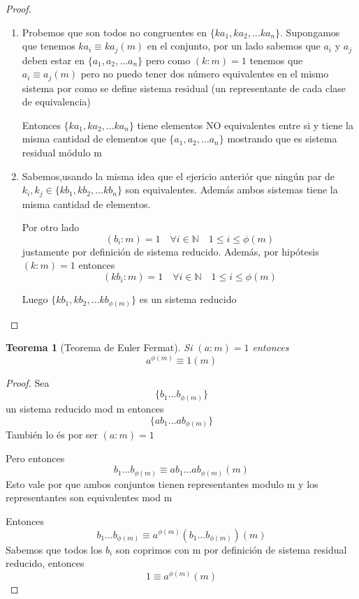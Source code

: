 \documentclass{article}
\theoremstyle{break}
\newtheorem{theorem}{Teorema}[section]
\def \N{\mathbb{N}}
\begin{document}
        \begin{proof}
            \begin{enumerate}
                \item Probemos que son todos no congruentes en $\{ka_1,ka_2,\ldots ka_n\}$.
                Supongamos que tenemos  $ka_i \equiv ka_j (m)$ en el conjunto, por un lado sabemos que 
                $a_i$ y $a_j$ deben estar en $\{a_1,a_2,\ldots a_n\}$ pero como $(k:m)=1$ 
                tenemos que $a_i \equiv a_j (m)$ pero no puedo tener dos número equivalentes en el mismo sistema
                por como se define sistema residual (un representante de cada clase de equivalencia)


                Entonces $\{ka_1,ka_2,\ldots ka_n\}$ tiene elementos NO equivalentes entre si y tiene la misma
                cantidad de elementos que $\{a_1,a_2,\ldots a_n\}$ mostrando que es sistema residual módulo m
                
                \item Sabemos,usando la misma idea que el ejericio anteriór que ningún par de 
                $k_i,k_j \in \{kb_1,kb_2,\ldots kb_n\}$ son equivalentes. Además ambos sistemas tiene la misma
                cantidad de elementos. 
                
                Por otro lado $$(b_i:m)=1 \quad\forall i\in\N \quad 1\leq i \leq \phi(m)$$ justamente por 
                definición de sistema reducido. Además, por hipótesis $(k:m)=1$ 
                entonces $$(kb_i:m)=1 \quad\forall i\in\N \quad  1\leq i \leq \phi(m)$$

                Luego $\{kb_1,kb_2,\ldots kb_{\phi(m)}\}$ es un sistema reducido
            \end{enumerate} 
        \end{proof}        


        \begin{theorem}[Teorema de Euler Fermat]
            Si $(a:m)=1$ entonces $$a^{\phi(m)} \equiv 1 (m)$$
        \end{theorem}

        \begin{proof}
            Sea $$\{b_1\ldots b_{\phi(m)}\}$$ un sistema reducido mod m entonces $$\{ab_1\ldots ab_{\phi(m)}\}$$
            También lo és por ser $(a:m)=1$

            Pero entonces $$b_1\ldots b_{\phi(m)} \equiv ab_1\ldots ab_{\phi(m)} (m) $$ Esto vale por que ambos
            conjuntos tienen representantes modulo m y los representantes son equivalentes mod m

            Entonces $$b_1\ldots b_{\phi(m)} \equiv a^{\phi(m)}(b_1\ldots b_{\phi(m)}) (m)$$ Sabemos que 
            todos los $b_i$ son coprimos con m por definición de sistema residual reducido, entonces 
            $$1  \equiv a^{\phi(m)} (m)$$ 
        \end{proof}
\end{document}

